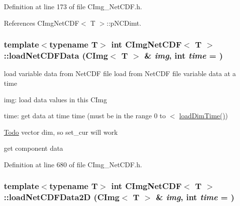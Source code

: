Definition at line 173 of file CImg\_\-NetCDF.h.

References CImgNetCDF$<$ T $>$::pNCDimt.\hypertarget{classCImgNetCDF_aa96033c01ced12a4fbe89ab8c7a3dade}{
\subsubsection[{loadNetCDFData}]{\setlength{\rightskip}{0pt plus 5cm}template$<$typename T$>$ int {\bf CImgNetCDF}$<$ T $>$::loadNetCDFData (CImg$<$ T $>$ \& {\em img}, \/  int {\em time} = {})}}
\label{classCImgNetCDF_aa96033c01ced12a4fbe89ab8c7a3dade}


load variable data from NetCDF file load from NetCDF file variable data at a time

\begin{DoxyItemize}
\item img: load data values in this {\ttfamily CImg} \item time: get data at time {\ttfamily time} (must be in the range 0 to $<$ {\ttfamily \hyperlink{classCImgNetCDF_a2ad26dcd306b26255c307e4f6d881240}{loadDimTime()}})\end{DoxyItemize}

\begin{DoxyCode}
\end{DoxyCode}
 

\begin{Desc}
\item[\hyperlink{todo__todo000001}{Todo}]vector dim, so set\_\-cur will work \end{Desc}


get component data 

Definition at line 680 of file CImg\_\-NetCDF.h.\hypertarget{classCImgNetCDF_a9e50ee49eb23896c5aa7de39e790464a}{
\subsubsection[{loadNetCDFData2D}]{\setlength{\rightskip}{0pt plus 5cm}template$<$typename T$>$ int {\bf CImgNetCDF}$<$ T $>$::loadNetCDFData2D (CImg$<$ T $>$ \& {\em img}, \/  int {\em time} = {})}}
\label{classCImgNetCDF_a9e50ee49eb23896c5aa7de39e790464a}


